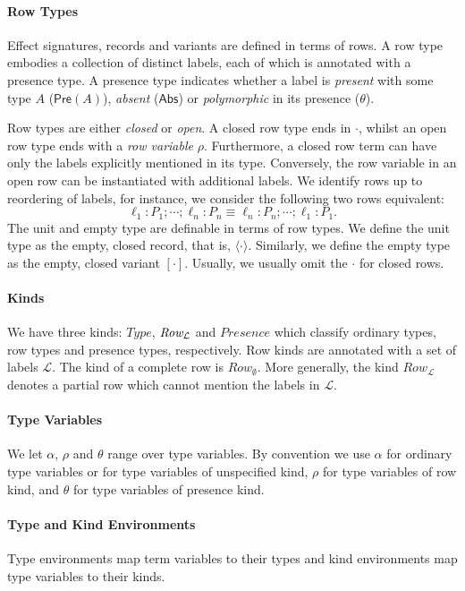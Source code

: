 \documentclass[mscres,icsa,lfcs,twoside,openright,logo,rightchapter,normalheadings]{infthesis}
\theoremstyle{definition}
\newcommand{\Record}[1]{\ensuremath{\langle #1 \rangle}}
\newcommand{\Pre}[1]{\mathsf{Pre}(#1)}
\newcommand{\Abs}{\mathsf{Abs}}
\begin{document}
\paragraph{Row Types}
Effect signatures, records and variants are defined in terms of rows.
A row type embodies a collection of distinct labels, each of which is
annotated with a presence type. A presence type indicates whether a
label is \emph{present} with some type $A$ ($\Pre{A}$), \emph{absent}
($\Abs$) or \emph{polymorphic} in its presence ($\theta$).

Row types are either \emph{closed} or \emph{open}. A closed row type
ends in $\cdot$, whilst an open row type ends with a \emph{row
  variable} $\rho$. Furthermore, a closed row term can have only the
labels explicitly mentioned in its type. Conversely, the row variable
in an open row can be instantiated with additional labels. We identify
rows up to reordering of labels, for instance, we consider the
following two rows equivalent:
\[ \ell_1 : P_1; \cdots; \ell_n : P_n \equiv \ell_n : P_n; \cdots ; \ell_1 : P_1. \]
The unit and empty type are definable in terms of row types. We define
the unit type as the empty, closed record, that is,
$\Record{\cdot}$. Similarly, we define the empty type as the empty,
closed variant $[\cdot]$. Usually, we usually omit the $\cdot$ for
closed rows.

\paragraph{Kinds}
We have three kinds: $Type$, $\emph{Row}_\mathcal{L}$ and $Presence$
which classify ordinary types, row types and presence types,
respectively. Row kinds are annotated with a set of labels
$\mathcal{L}$. The kind of a complete row is
$Row_{\mathcal{\emptyset}}$. More generally, the kind
$Row_{\mathcal{L}}$ denotes a partial row which cannot mention the
labels in $\mathcal{L}$.
%

\paragraph{Type Variables}
We let $\alpha$, $\rho$ and $\theta$ range over type variables. By
convention we use $\alpha$ for ordinary type variables or for type
variables of unspecified kind, $\rho$ for type variables of row kind,
and $\theta$ for type variables of presence kind.

\paragraph{Type and Kind Environments}
Type environments map term variables to their types and kind
environments map type variables to their kinds.
\end{document}
